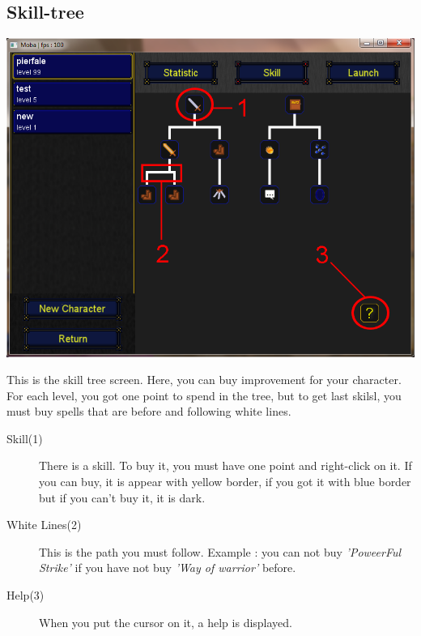 \documentclass{scrreprt}
\begin{document}
		  \subsection{Skill-tree}
		  \begin{center}
		  \includegraphics[scale=0.4]{skill_tree_screen.png}
		  \end{center}
		  This is the skill tree screen. Here, you can buy improvement for your character. For each level, you got one point to spend in the tree, but to get last skilsl, you must buy spells that are before and following white lines.
		  \begin{description}
		  \item[Skill(1)]{There is a skill. To buy it, you must have one point and right-click on it. If you can buy, it is appear with yellow border, if you got it with blue border but if you can't buy it, it is dark.}
		  \item[White Lines(2)]{This is the path you must follow. Example : you can not buy \emph{'PoweerFul Strike'} if you have not buy \emph{'Way of warrior'} before.}
		  \item[Help(3)]{When you put the cursor on it, a help is displayed.}
		  \end{description}
\end{document}
